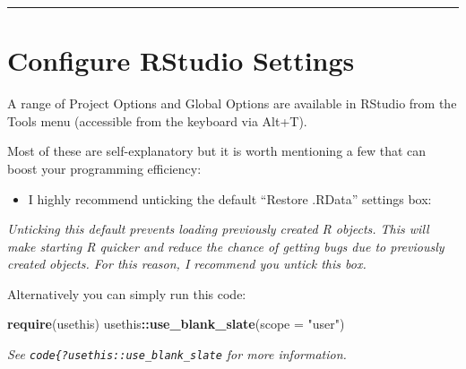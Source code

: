 \documentclass[
]{book}
\newenvironment{Shaded}{\begin{snugshade}}{\end{snugshade}}
\newcommand{\DataTypeTok}[1]{\textcolor[rgb]{0.13,0.29,0.53}{#1}}
\newcommand{\KeywordTok}[1]{\textcolor[rgb]{0.13,0.29,0.53}{\textbf{#1}}}
\newcommand{\NormalTok}[1]{#1}
\newcommand{\OperatorTok}[1]{\textcolor[rgb]{0.81,0.36,0.00}{\textbf{#1}}}
\newcommand{\StringTok}[1]{\textcolor[rgb]{0.31,0.60,0.02}{#1}}
\providecommand{\tightlist}{%
  \setlength{\itemsep}{0pt}\setlength{\parskip}{0pt}}
\begin{document}
\begin{center}\rule{0.5\linewidth}{0.5pt}\end{center}

\hypertarget{configure-rstudio-settings}{%
\section{Configure RStudio Settings}\label{configure-rstudio-settings}}

A range of Project Options and Global Options are available in RStudio from the Tools menu (accessible from the keyboard via Alt+T).

Most of these are self-explanatory but it is worth mentioning a few that can boost
your programming efficiency:

\begin{itemize}
\tightlist
\item
  I highly recommend unticking the default ``Restore .RData'' settings box:
\end{itemize}

\emph{Unticking this default prevents loading previously created R objects. This will make starting R quicker and reduce the chance of getting bugs due to previously created objects. For this reason, I recommend you untick this box.}

Alternatively you can simply run this code:

\begin{Shaded}
\begin{Highlighting}[]
\KeywordTok{require}\NormalTok{(usethis)}
\NormalTok{usethis}\OperatorTok{::}\KeywordTok{use\_blank\_slate}\NormalTok{(}\DataTypeTok{scope =} \StringTok{"user"}\NormalTok{)}
\end{Highlighting}
\end{Shaded}

\emph{See \texttt{code\{?usethis::use\_blank\_slate} for more information.}
\end{document}
